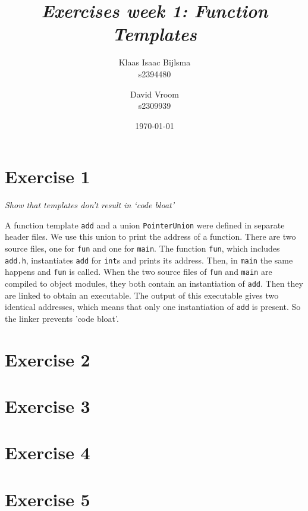 \documentclass[12pt]{article}
\title{\itshape Exercises week 1: Function Templates}
\author{
	Klaas Isaac Bijlsma \\ s2394480
	\and
	David Vroom \\ s2309939
}
\date{\today}
\newcommand{\desc}[1]{\textit{#1} \vspace{1em}}
\begin{document}
\maketitle

\section*{Exercise 1}
\desc{Show that templates don't result in `code bloat'}

A function template \texttt{add} and a union \texttt{PointerUnion} were defined in separate header files. We use this union to print the address of a function. There are two source files, one for \texttt{fun} and one for \texttt{main}. The function \texttt{fun}, which includes \texttt{add.h}, instantiates \texttt{add} for \texttt{int}s and prints its address. Then, in \texttt{main} the same happens and \texttt{fun} is called. When the two source files of \texttt{fun} and \texttt{main} are compiled to object modules, they both contain an instantiation of \texttt{add}. Then they are linked to obtain an executable. The output of this executable gives two identical addresses, which means that only one instantiation of \texttt{add} is present. So the linker prevents 'code bloat'.







\clearpage

\section*{Exercise 2}
\desc{}


\clearpage

\section*{Exercise 3}
\desc{}


\clearpage

\section*{Exercise 4}
\desc{}


\clearpage

\section*{Exercise 5}
\desc{}


\clearpage
\end{document}
